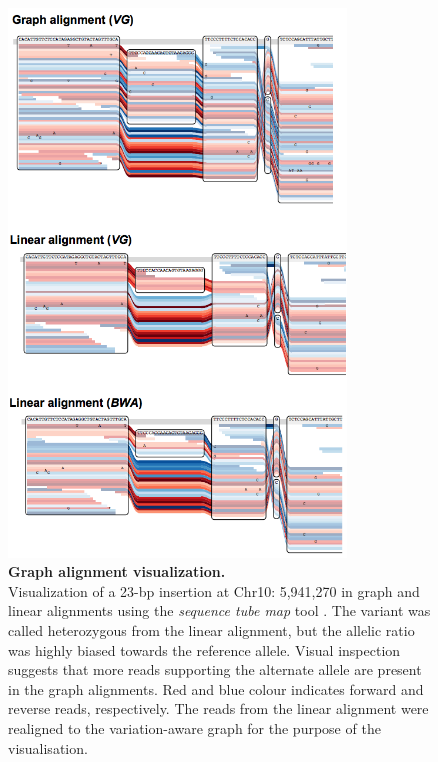 \documentclass[../main.tex]{subfiles}
\begin{document}
\begin{flushleft}
\begin{figure}[!htb]
    \centering
    \includegraphics[width=0.8\textwidth]{paper2/supplement/sp314.png}
    \caption[ Graph alignment visualization.]{\textbf{Graph alignment visualization.} \\
    \small{Visualization of a 23-bp insertion at
    Chr10: 5,941,270 in graph and linear alignments using the \emph{sequence tube map} tool \citep{beyer2019sequence}. The variant was called heterozygous from the linear alignment,
    but the allelic ratio was highly biased towards the reference allele. Visual inspection
    suggests that more reads supporting the alternate allele are present in the graph
    alignments. Red and blue colour indicates forward and reverse reads, respectively.
    The reads from the linear alignment were realigned to the variation-aware graph for
    the purpose of the visualisation.}}
    \label{sup_fig:s314}
\end{figure}


\end{flushleft}
\end{document}
